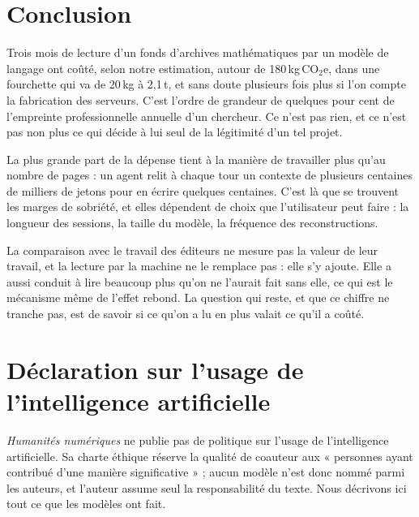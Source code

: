 \documentclass[11pt,a4paper]{article}
\begin{document}
\section{Conclusion}

Trois mois de lecture d'un fonds d'archives mathématiques par un modèle de langage ont coûté, selon notre estimation, autour de 180\,kg\,CO$_2$e, dans une fourchette qui va de 20\,kg à 2,1\,t, et sans doute plusieurs fois plus si l'on compte la fabrication des serveurs. C'est l'ordre de grandeur de quelques pour cent de l'empreinte professionnelle annuelle d'un chercheur. Ce n'est pas rien, et ce n'est pas non plus ce qui décide à lui seul de la légitimité d'un tel projet.

La plus grande part de la dépense tient à la manière de travailler plus qu'au nombre de pages : un agent relit à chaque tour un contexte de plusieurs centaines de milliers de jetons pour en écrire quelques centaines. C'est là que se trouvent les marges de sobriété, et elles dépendent de choix que l'utilisateur peut faire : la longueur des sessions, la taille du modèle, la fréquence des reconstructions.

La comparaison avec le travail des éditeurs ne mesure pas la valeur de leur travail, et la lecture par la machine ne le remplace pas : elle s'y ajoute. Elle a aussi conduit à lire beaucoup plus qu'on ne l'aurait fait sans elle, ce qui est le mécanisme même de l'effet rebond. La question qui reste, et que ce chiffre ne tranche pas, est de savoir si ce qu'on a lu en plus valait ce qu'il a coûté.

\section*{Déclaration sur l'usage de l'intelligence artificielle}

\emph{Humanités numériques} ne publie pas de politique sur l'usage de l'intelligence artificielle. Sa charte éthique réserve la qualité de coauteur aux « personnes ayant contribué d'une manière significative » ; aucun modèle n'est donc nommé parmi les auteurs, et l'auteur assume seul la responsabilité du texte. Nous décrivons ici tout ce que les modèles ont fait.
\end{document}

